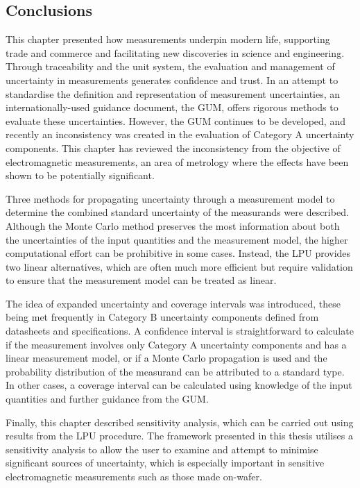 \documentclass[../thesis/thesis.tex]{subfiles}
\begin{document}
\begin{refsection}
\section{Conclusions}

This chapter presented how measurements underpin modern life, supporting trade and commerce and facilitating new discoveries in science and engineering. Through traceability and the unit system, the evaluation and management of uncertainty in measurements generates confidence and trust. In an attempt to standardise the definition and representation of measurement uncertainties, an internationally-used guidance document, the GUM, offers rigorous methods to evaluate these uncertainties. However, the GUM continues to be developed, and recently an inconsistency was created in the evaluation of Category A uncertainty components. This chapter has reviewed the inconsistency from the objective of electromagnetic measurements, an area of metrology where the effects have been shown to be potentially significant.

Three methods for propagating uncertainty through a measurement model to determine the combined standard uncertainty of the measurands were described. Although the Monte Carlo method preserves the most information about both the uncertainties of the input quantities and the measurement model, the higher computational effort can be prohibitive in some cases. Instead, the LPU provides two linear alternatives, which are often much more efficient but require validation to ensure that the measurement model can be treated as linear.

The idea of expanded uncertainty and coverage intervals was introduced, these being met frequently in Category B uncertainty components defined from datasheets and specifications. A confidence interval is straightforward to calculate if the measurement involves only Category A uncertainty components and has a linear measurement model, or if a Monte Carlo propagation is used and the probability distribution of the measurand can be attributed to a standard type. In other cases, a coverage interval can be calculated using knowledge of the input quantities and further guidance from the GUM.

Finally, this chapter described sensitivity analysis, which can be carried out using results from the LPU procedure. The framework presented in this thesis utilises a sensitivity analysis to allow the user to examine and attempt to minimise significant sources of uncertainty, which is especially important in sensitive electromagnetic measurements such as those made on-wafer.

\printbibliography[title=References]
\end{refsection}
\end{document}
